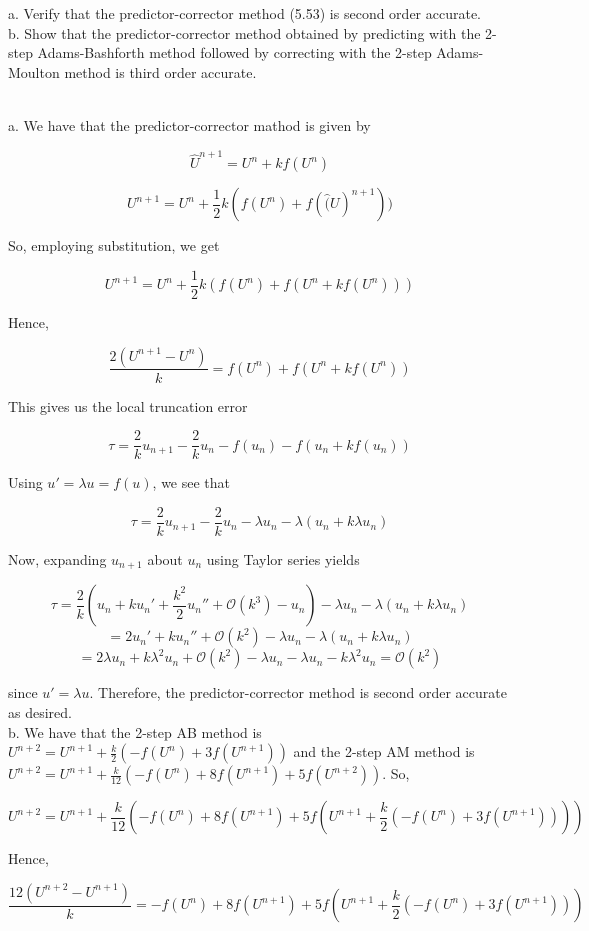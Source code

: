a. Verify that the predictor-corrector method (5.53) is second order accurate.\\
b. Show that the predictor-corrector method obtained by predicting with the 2-step Adams-Bashforth
method followed by correcting with the 2-step Adams-Moulton method is third order accurate.\\

\begin{solution}\renewcommand{\qedsymbol}{}\ \\
    a. We have that the predictor-corrector mathod is given by

    $$\hat{U}^{n+1}=U^n+kf(U^n)$$

    $$U^{n+1}=U^n+\frac12k(f(U^n)+f(\hat(U)^{n+1}))$$

    So, employing substitution, we get

    $$U^{n+1}=U^n+\frac12k(f(U^n)+f(U^n+kf(U^n)))$$

    Hence,

    $$\frac{2(U^{n+1}-U^n)}{k}=f(U^n)+f(U^n+kf(U^n))$$

    This gives us the local truncation error

    $$\tau=\frac2ku_{n+1}-\frac2ku_n-f(u_n)-f(u_n+kf(u_n))$$

    Using $u'=\lambda u=f(u)$, we see that

    $$\tau=\frac2ku_{n+1}-\frac2ku_n-\lambda u_n-\lambda(u_n+k\lambda u_n)$$

    Now, expanding $u_{n+1}$ about $u_n$ using Taylor series yields

    $$\tau=\frac2k(u_n+ku_n'+\frac{k^2}{2}u_n''+\mathcal{O}(k^3)-u_n)-\lambda u_n-
    \lambda(u_n+k\lambda u_n)$$
    $$=2u_n'+ku_n''+\mathcal{O}(k^2)-\lambda u_n-\lambda(u_n+k\lambda u_n)$$
    $$=2\lambda u_n+k\lambda^2u_n+\mathcal{O}(k^2)-\lambda u_n-\lambda u_n-k\lambda^2 u_n
    =\mathcal{O}(k^2)$$

    since $u'=\lambda u$. Therefore, the predictor-corrector method is second order accurate as
    desired.\\

    b. We have that the 2-step AB method is $U^{n+2}=U^{n+1}+\frac{k}{2}(-f(U^n)+3f(U^{n+1}))$ and the
    2-step AM method is $U^{n+2}=U^{n+1}+\frac{k}{12}(-f(U^n)+8f(U^{n+1})+5f(U^{n+2}))$. So,

    $$U^{n+2}=U^{n+1}+\frac{k}{12}(-f(U^n)+8f(U^{n+1})+5f(U^{n+1}+\frac{k}{2}(-f(U^n)+3f(U^{n+1}))))$$

    Hence,

    $$\frac{12(U^{n+2}-U^{n+1})}{k}=-f(U^n)+8f(U^{n+1})+5f(U^{n+1}+\frac{k}{2}(-f(U^n)+3f(U^{n+1})))$$


\end{solution}
